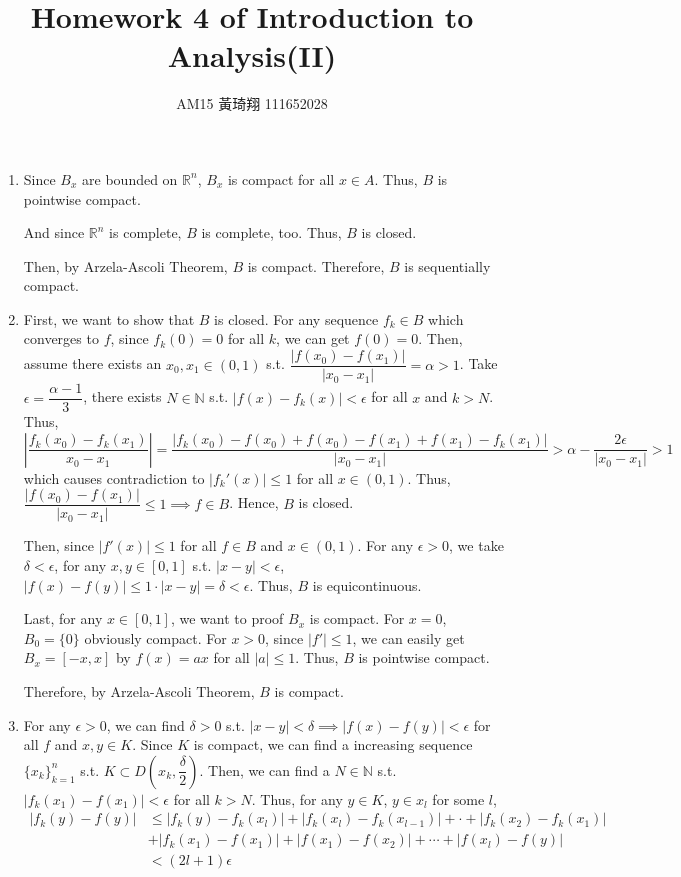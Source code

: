 \documentclass[12pt]{article}
\title{Homework 4 of Introduction to Analysis(II)}
\author{AM15 黃琦翔 111652028}
\begin{document}
\maketitle
\begin{enumerate}
    \item Since $B_x$ are bounded on $\mathbb{R}^n$, $B_x$ is compact for all $x\in A$.
    Thus, $B$ is pointwise compact.

    And since $\mathbb{R}^n$ is complete, $B$ is complete, too.
    Thus, $B$ is closed.

    Then, by Arzela-Ascoli Theorem, $B$ is compact.
    Therefore, $B$ is sequentially compact.

    \item First, we want to show that $B$ is closed.
    For any sequence $f_k \in B$ which converges to $f$, 
    since $f_k(0) = 0$ for all $k$, we can get $f(0) = 0$.
    Then, assume there exists an $x_0, x_1 \in (0, 1)$ s.t. $\dfrac{|f(x_0) - f(x_1)|}{|x_0 - x_1|} = \alpha > 1$.
    Take $\epsilon = \dfrac{\alpha-1}{3}$, there exists $N \in \mathbb{N}$ s.t. $|f(x) - f_k(x)| < \epsilon$ for all $x$ and $k > N$.
    Thus, $|\dfrac{f_k(x_0) - f_k(x_1)}{x_0 - x_1}| = \dfrac{|f_k(x_0) - f(x_0) + f(x_0) - f(x_1) + f(x_1) - f_k(x_1)|}{|x_0 - x_1|} > \alpha - \dfrac{2\epsilon}{|x_0 - x_1|} > 1$ 
    which causes contradiction to $|f_k'(x)| \leq 1$ for all $x\in (0, 1)$.
    Thus, $\dfrac{|f(x_0) - f(x_1)|}{|x_0 - x_1|} \leq 1\implies f\in B$.
    Hence, $B$ is closed.
    
    Then, since $|f'(x)| \leq 1$ for all $f\in B$ and $x\in (0, 1)$.
    For any $\epsilon > 0$, we take $\delta < \epsilon$,
    for any $x, y \in [0, 1]$ s.t. $|x - y| < \epsilon$, 
    $|f(x) - f(y)| \leq 1 \cdot |x-y| = \delta < \epsilon$.
    Thus, $B$ is equicontinuous.

    Last, for any $x \in [0, 1]$, we want to proof $B_x$ is compact.
    For $x = 0$, $B_0 = \{ 0\}$ obviously compact.
    For $x > 0$, since $|f'|\leq 1$, we can easily get $B_x = [-x, x]$ by $f(x) = ax$ for all $|a| \leq 1$.
    Thus, $B$ is pointwise compact.

    Therefore, by Arzela-Ascoli Theorem, $B$ is compact.

    \item For any $\epsilon > 0$, we can find $\delta > 0$ s.t. $|x-y| < \delta\implies |f(x) - f(y)| < \epsilon$ for all $f$ and $x, y \in K$.
    Since $K$ is compact, we can find a increasing sequence $\{ x_k\}_{k=1}^n$ s.t. $K \subset D(x_k, \dfrac{\delta}{2})$.
    Then, we can find a $N \in \mathbb{N}$ s.t. $|f_k(x_1) - f(x_1)| < \epsilon$ for all $k > N$.
    Thus, for any $y \in K$, $y \in x_l$ for some $l$, \begin{align*}
        |f_k(y) - f(y)| &\leq |f_k(y) - f_k(x_l)| + |f_k(x_l) - f_k(x_{l-1})| + \cdot + |f_k(x_2) - f_k(x_1)|\\
        & + |f_k(x_1) - f(x_1)| + |f(x_1) - f(x_2)| + \cdots + |f(x_l) - f(y)|\\
        &< (2l+1)\epsilon
    \end{align*}
\end{enumerate}
\end{document}
